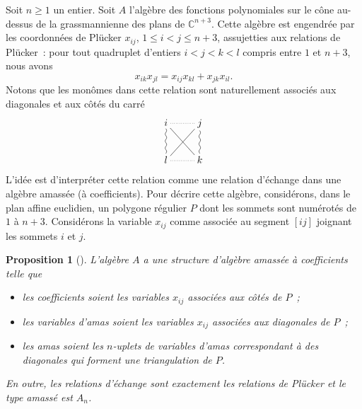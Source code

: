 \documentclass[brochure,12pt]{bourbaki}
\numberwithin{equation}{subsection}
\numberwithin{theorem}{section}
\newtheorem{proposition}[theorem]{Proposition}
\newcommand{\C}{\mathbb{C}}
\begin{document}
Soit $n\geq 1$ un entier. Soit $A$ l'alg\`ebre des fonctions
polynomiales sur le c\^one au-dessus de la grassmannienne des plans de
$\C^{n+3}$.  Cette alg\`ebre est engendr\'ee par les coordonn\'ees de
Pl\"ucker $x_{ij}$, $1\leq i<j\leq n+3$, assujetties aux relations de
Pl\"ucker~: pour tout quadruplet d'entiers $i<j<k<l$ compris entre
$1$ et $n+3$, nous avons
\begin{equation} \label{eq:Plucker}
x_{ik} x_{jl} = x_{ij} x_{kl} + x_{jk} x_{il}.
\end{equation}
Notons que les mon\^omes dans cette relation sont naturellement associ\'es
aux diagonales et aux c\^ot\'es du carr\'e
\[
\xymatrix{ i \ar@{.}[r] \ar@{~}[d] \ar@{-}[dr] & j \ar@{-}[dl] \ar@{~}[d] \\
l \ar@{.}[r] & k}
\]
L'id\'ee est d'interpr\'eter cette relation comme une
relation d'\'echange dans une alg\`ebre amass\'ee (\`a coefficients).
Pour d\'ecrire cette alg\`ebre, consid\'erons, dans le plan
affine euclidien, un polygone r\'egulier $P$
dont les sommets
sont num\'erot\'es de $1$ \`a $n+3$.
Consid\'erons la variable $x_{ij}$ comme associ\'ee au
segment $[ij]$ joignant les sommets $i$ et $j$.

\begin{proposition}[]
\label{prop:plans} L'alg\`ebre $A$ a une structure d'alg\`ebre
amass\'ee \`a coefficients telle que
\begin{itemize}
\item[-] les coefficients soient les variables $x_{ij}$ associ\'ees aux
c\^ot\'es de $P$~;
\item[-] les variables d'amas soient les variables $x_{ij}$ associ\'ees
aux diagonales de $P$~;
\item[-] les amas soient les $n$-uplets de variables d'amas
correspondant \`a des diagonales qui forment une triangulation de $P$.
\end{itemize}
En outre, les relations d'\'echange sont exactement les relations
de Pl\"ucker et le type amass\'e est $A_n$.
\end{proposition}
\end{document}
